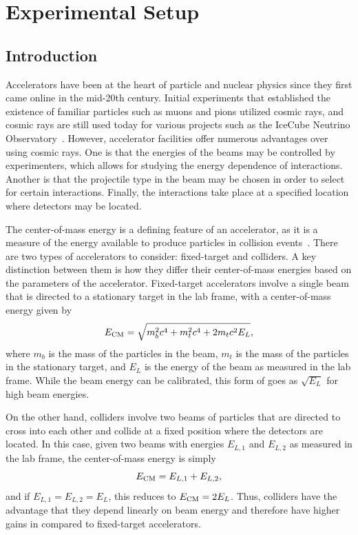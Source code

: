 
\chapter{Experimental Setup}
\label{chap:exp}

\section{Introduction}

Accelerators have been at the heart of particle and nuclear physics since they first came online in the mid-20th century.
Initial experiments that established the existence of familiar particles such as muons and pions utilized cosmic rays, and cosmic rays are still used today for various projects such as the IceCube Neutrino Observatory~\cite{Abbasi_2009}.
However, accelerator facilities offer numerous advantages over using cosmic rays.
One is that the energies of the beams may be controlled by experimenters, which allows for studying the energy dependence of interactions.
Another is that the projectile type in the beam may be chosen in order to select for certain interactions.
Finally, the interactions take place at a specified location where detectors may be located.

The center-of-mass energy \ECM\footnotemark{} is a defining feature of an accelerator, as it is a measure of the energy available to produce particles in collision events~\cite{martin2008particle}.
There are two types of accelerators to consider: fixed-target and colliders. %
A key distinction between them is how they differ their center-of-mass energies based on the parameters of the accelerator.
Fixed-target accelerators involve a single beam that is directed to a stationary target in the lab frame, with a center-of-mass energy given by
\begin{equation}
  E_\mathrm{CM}=\sqrt{m_b^2c^4+m_t^2c^4+2m_tc^2E_L},
\end{equation}
where $m_b$ is the mass of the particles in the beam, $m_t$ is the mass of the particles in the stationary target, and $E_L$ is the energy of the beam as measured in the lab frame.
While the beam energy can be calibrated, this form of \ECM goes as $\sqrt{E_L}$ for high beam energies.

On the other hand, colliders involve two beams of particles that are directed to cross into each other and collide at a fixed position where the detectors are located.
In this case, given two beams with energies $E_{L,1}$ and $E_{L,2}$ as measured in the lab frame, the center-of-mass energy is simply
\begin{equation}
  E_\mathrm{CM}=E_{L,1}+E_{L,2},
\end{equation}
and if $E_{L,1}=E_{L,2}=E_L$, this reduces to $E_\mathrm{CM}=2E_L$.
Thus, colliders have the advantage that they depend linearly on beam energy and therefore have higher gains in \ECM compared to fixed-target accelerators.

